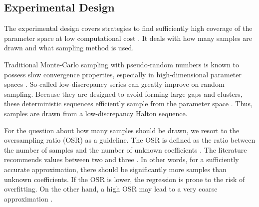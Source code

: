 \subsection{Experimental Design}
\label{sec:sampling}



The experimental design covers strategies to find sufficiently high coverage
of the parameter space at low computational cost \cite{fajraoui_optimal_2017,usher_value_2015}.
It deals with how many samples are drawn and what sampling method is used.


Traditional Monte-Carlo sampling with pseudo-random numbers is known to
possess slow convergence properties, %
especially in high-dimensional parameter spaces \cite{TBD}.
So-called low-discrepancy series can greatly improve on random sampling.
Because they are designed to avoid forming large gaps and clusters,
these deterministic sequences efficiently sample from the parameter space \cite{fajraoui_optimal_2017}.
Thus, samples are drawn from a low-discrepancy Halton sequence.


For the question about how many samples should be drawn,
we resort to the oversampling ratio (OSR) as a guideline.
The OSR is defined as the ratio between the number of samples
and the number of unknown coefficients \cite{palar_multi-fidelity_2016}.
The literature recommends values between two and three \cite{hosder2007,palar_multi-fidelity_2016,fajraoui_optimal_2017,gratiet_metamodel-based_2015}.
In other words, for a sufficiently accurate approximation,
there should be significantly more samples than unknown coefficients.
If the OSR is lower, the regression is prone to the risk of overfitting.
On the other hand, a high OSR may lead to a very coarse approximation \cite{palar_multi-fidelity_2016}.

